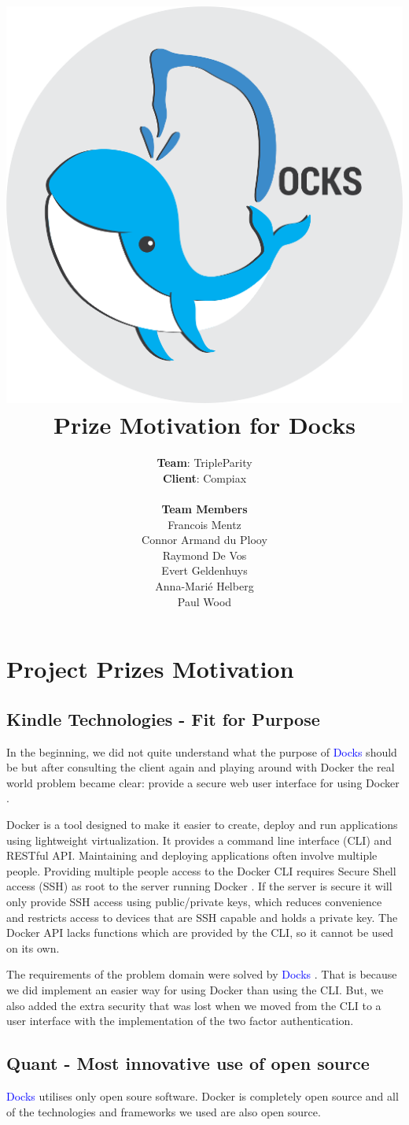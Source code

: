 \documentclass[]{article}
\title{
	\vspace{-1.5cm}
	\includegraphics[scale=0.7]{docks_round_512.png}
	\\[1cm]
	Prize Motivation for Docks}
\author{\textbf{Team}: TripleParity\\
\textbf{Client}: Compiax\\
\\
\textbf{Team Members}\\
Francois Mentz\\
Connor Armand du Plooy\\
Raymond De Vos\\
Evert Geldenhuys\\
Anna-Marié Helberg\\
Paul Wood}
\date{}
\newcommand{\docks}{\textcolor{Blue}{Docks} }
\newcommand{\docker}{Docker }
\begin{document}
\maketitle

\tableofcontents

\pagebreak

\section{Project Prizes Motivation}
\subsection{Kindle Technologies - Fit for Purpose}

In the beginning, we did not quite understand what the purpose of \docks should be but 
after consulting the client again and playing around with \docker the real world problem
became clear: provide a secure web user interface for using \docker.

\docker is a tool designed to make it easier to create, deploy and run applications
using lightweight virtualization. It provides a command line interface (CLI)
and RESTful API. Maintaining and deploying applications often involve multiple
people. Providing multiple people access to the \docker CLI requires
Secure Shell access (SSH) as root to the server running \docker. If the server
is secure it will only provide SSH access using public/private keys, which
reduces convenience and restricts access to devices that are SSH capable and
holds a private key. The \docker API lacks functions which are provided by
the CLI, so it cannot be used on its own.

The requirements of the problem domain were solved by \docks. That is because we did implement
an easier way for using \docker than using the CLI. But, we also added the extra security that
was lost when we moved from the CLI to a user interface with the implementation of the two factor
authentication.

\subsection{Quant - Most innovative use of open source}
\docks utilises only open soure software. Docker is completely open source and all
of the technologies and frameworks we used are also open source. 
\end{document}
